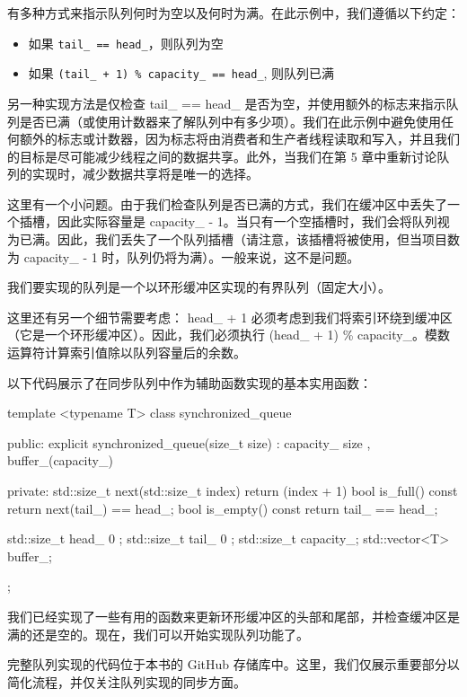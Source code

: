 有多种方式来指示队列何时为空以及何时为满。在此示例中，我们遵循以下约定：

\begin{itemize}
\item
如果 \verb|tail_ == head_|，则队列为空

\item
如果 \verb|(tail_ + 1) % capacity_ == head_|, 则队列已满
\end{itemize}

另一种实现方法是仅检查 tail\_ == head\_ 是否为空，并使用额外的标志来指示队列是否已满（或使用计数器来了解队列中有多少项）。我们在此示例中避免使用任何额外的标志或计数器，因为标志将由消费者和生产者线程读取和写入，并且我们的目标是尽可能减少线程之间的数据共享。此外，当我们在第 5 章中重新讨论队列的实现时，减少数据共享将是唯一的选择。

这里有一个小问题。由于我们检查队列是否已满的方式，我们在缓冲区中丢失了一个插槽，因此实际容量是 capacity\_ - 1。当只有一个空插槽时，我们会将队列视为已满。因此，我们丢失了一个队列插槽（请注意，该插槽将被使用，但当项目数为 capacity\_ - 1 时，队列仍将为满）。一般来说，这不是问题。

我们要实现的队列是一个以环形缓冲区实现的有界队列（固定大小）。

这里还有另一个细节需要考虑： head\_ + 1 必须考虑到我们将索引环绕到缓冲区（它是一个环形缓冲区）。因此，我们必须执行 (head\_ + 1) \% capacity\_。模数运算符计算索引值除以队列容量后的余数。

以下代码展示了在同步队列中作为辅助函数实现的基本实用函数：

\begin{cpp}
template <typename T>
class synchronized_queue {
public:
    explicit synchronized_queue(size_t size) :
        capacity_{ size }, buffer_(capacity_) {
    }

private:
    std::size_t next(std::size_t index) {
        return (index + 1)%
    }
    bool is_full() const {
        return next(tail_) == head_;
    }
    bool is_empty() const {
        return tail_ == head_;
    }

    std::size_t head_{ 0 };
    std::size_t tail_{ 0 };
    std::size_t capacity_;
    std::vector<T> buffer_;
};
\end{cpp}

我们已经实现了一些有用的函数来更新环形缓冲区的头部和尾部，并检查缓冲区是满的还是空的。现在，我们可以开始实现队列功能了。

完整队列实现的代码位于本书的 GitHub 存储库中。这里，我们仅展示重要部分以简化流程，并仅关注队列实现的同步方面。

